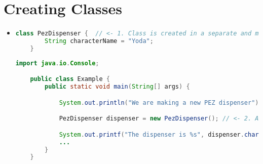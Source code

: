 \documentclass[12pt]{article}
\begin{document}
\bigskip

\section{Creating Classes}

\bigskip

\begin{itemize}
    \item

    \begin{lstlisting}[language=Java,caption={lesson\_3/PezDispenser.java}]
    class PezDispenser {  // <- 1. Class is created in a separate and matching file :)
        String characterName = "Yoda";
    }
    \end{lstlisting}

    \bigskip

    \begin{lstlisting}[language=Java,caption={lesson\_3/Example.java}]
    import java.io.Console;

    public class Example {
        public static void main(String[] args) {

            System.out.println("We are making a new PEZ dispenser");

            PezDispenser dispenser = new PezDispenser(); // <- 2. And is used here :)

            System.out.printf("The dispenser is %s", dispenser.characterName);
            ...
        }
    }
    \end{lstlisting}
\end{itemize}
\end{document}
